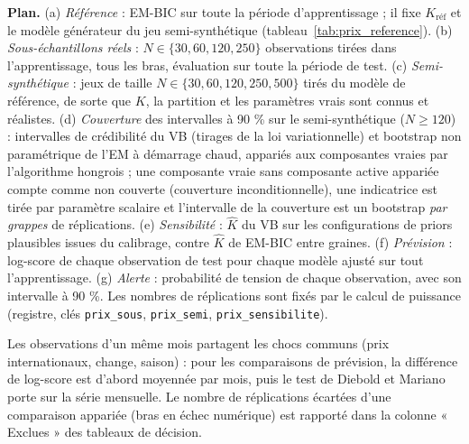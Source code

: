 \textbf{Plan. }(a) \emph{Référence} : EM-BIC sur toute la période d'apprentissage ; il fixe $K_{\text{réf}}$ et le modèle générateur du jeu semi-synthétique (tableau~\ref{tab:prix_reference}). (b) \emph{Sous-échantillons réels} : $N \in \{30, 60, 120, 250\}$ observations tirées dans l'apprentissage, tous les bras, évaluation sur toute la période de test. (c) \emph{Semi-synthétique} : jeux de taille $N \in \{30, 60, 120, 250, 500\}$ tirés du modèle de référence, de sorte que $K$, la partition et les paramètres vrais sont connus et réalistes. (d) \emph{Couverture} des intervalles à 90 \% sur le semi-synthétique ($N \geq 120$) : intervalles de crédibilité du VB (tirages de la loi variationnelle) et bootstrap non paramétrique de l'EM à démarrage chaud, appariés aux composantes vraies par l'algorithme hongrois ; une composante vraie sans composante active appariée compte comme non couverte (couverture inconditionnelle), une indicatrice est tirée par paramètre scalaire et l'intervalle de la couverture est un bootstrap \emph{par grappes} de réplications. (e) \emph{Sensibilité} : $\hat K$ du VB sur les configurations de priors plausibles issues du calibrage, contre $\hat K$ de EM-BIC entre graines. (f) \emph{Prévision} : log-score de chaque observation de test pour chaque modèle ajusté sur tout l'apprentissage. (g) \emph{Alerte} : probabilité de tension de chaque observation, avec son intervalle à 90 \%. Les nombres de réplications sont fixés par le calcul de puissance (registre, clés \texttt{prix\_sous}, \texttt{prix\_semi}, \texttt{prix\_sensibilite}).



Les observations d'un même mois partagent les chocs communs (prix internationaux, change, saison) : pour les comparaisons de prévision, la différence de log-score est d'abord moyennée par mois, puis le test de Diebold et Mariano~\cite{diebold1995} porte sur la série mensuelle. Le nombre de réplications écartées d'une comparaison appariée (bras en échec numérique) est rapporté dans la colonne « Exclues » des tableaux de décision.

